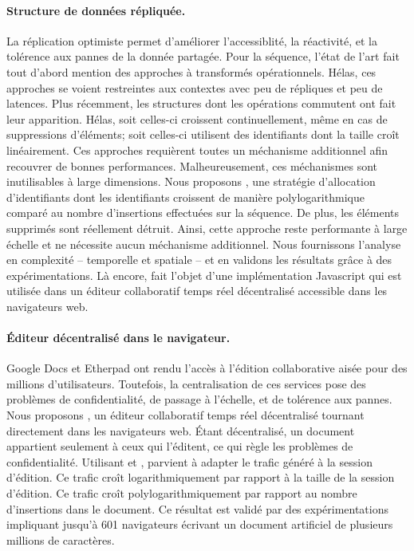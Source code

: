 \paragraph{Structure de données répliquée.} La réplication optimiste permet
d'améliorer l'accessiblité, la réactivité, et la tolérence aux pannes de la
donnée partagée. Pour la séquence, l'état de l'art fait tout d'abord mention des
approches à transformés opérationnels. Hélas, ces approches se voient
restreintes aux contextes avec peu de répliques et peu de latences. Plus
récemment, les structures dont les opérations commutent ont fait leur
apparition. Hélas, soit celles-ci croissent continuellement, même en cas de
suppressions d'éléments; soit celles-ci utilisent des identifiants dont la
taille croît linéairement. Ces approches requièrent toutes un méchanisme
additionnel afin recouvrer de bonnes performances. Malheureusement, ces
méchanismes sont inutilisables à large dimensions. Nous proposons \LSEQ, une
stratégie d'allocation d'identifiants dont les identifiants croissent de manière
polylogarithmique comparé au nombre d'insertions effectuées sur la séquence. De
plus, les éléments supprimés sont réellement détruit. Ainsi, cette approche
reste performante à large échelle et ne nécessite aucun méchanisme additionnel.
Nous fournissons l'analyse en complexité -- temporelle et spatiale -- et en
validons les résultats grâce à des expérimentations. Là encore, \LSEQ fait
l'objet d'une implémentation Javascript qui est utilisée dans un éditeur
collaboratif temps réel décentralisé accessible dans les navigateurs web.


\paragraph{Éditeur décentralisé dans le navigateur.} Google Docs et Etherpad ont
rendu l'accès à l'édition collaborative aisée pour des millions
d'utilisateurs. Toutefois, la centralisation de ces services pose des problèmes
de confidentialité, de passage à l'échelle, et de tolérence aux pannes. Nous
proposons \CRATE, un éditeur collaboratif temps réel décentralisé tournant
directement dans les navigateurs web. Étant décentralisé, un document appartient
seulement à ceux qui l'éditent, ce qui règle les problèmes de
confidentialité. Utilisant \SPRAY et \LSEQ, \CRATE parvient à adapter le trafic
généré à la session d'édition. Ce trafic croît logarithmiquement par rapport à
la taille de la session d'édition. Ce trafic croît polylogarithmiquement par
rapport au nombre d'insertions dans le document. Ce résultat est validé par des
expérimentations impliquant jusqu'à 601 navigateurs écrivant un document
artificiel de plusieurs millions de caractères.

